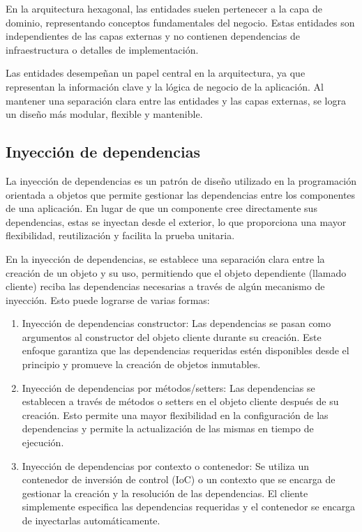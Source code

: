 \documentclass[executivepaper]{article}
\begin{document}
En la arquitectura hexagonal, las entidades suelen pertenecer a la capa de dominio, representando conceptos fundamentales del negocio. Estas entidades son independientes de las capas externas y no contienen dependencias de infraestructura o detalles de implementación.

Las entidades desempeñan un papel central en la arquitectura, ya que representan la información clave y la lógica de negocio de la aplicación. Al mantener una separación clara entre las entidades y las capas externas, se logra un diseño más modular, flexible y mantenible.

\subsection{Inyección de dependencias}

La inyección de dependencias es un patrón de diseño utilizado en la programación orientada a objetos que permite gestionar las dependencias entre los componentes de una aplicación. En lugar de que un componente cree directamente sus dependencias, estas se inyectan desde el exterior, lo que proporciona una mayor flexibilidad, reutilización y facilita la prueba unitaria.

En la inyección de dependencias, se establece una separación clara entre la creación de un objeto y su uso, permitiendo que el objeto dependiente (llamado cliente) reciba las dependencias necesarias a través de algún mecanismo de inyección. Esto puede lograrse de varias formas:

\begin{enumerate}
    \item Inyección de dependencias constructor: Las dependencias se pasan como argumentos al constructor del objeto cliente durante su creación. Este enfoque garantiza que las dependencias requeridas estén disponibles desde el principio y promueve la creación de objetos inmutables.
    \item Inyección de dependencias por métodos/setters: Las dependencias se establecen a través de métodos o setters en el objeto cliente después de su creación. Esto permite una mayor flexibilidad en la configuración de las dependencias y permite la actualización de las mismas en tiempo de ejecución.
    \item Inyección de dependencias por contexto o contenedor: Se utiliza un contenedor de inversión de control (IoC) o un contexto que se encarga de gestionar la creación y la resolución de las dependencias. El cliente simplemente especifica las dependencias requeridas y el contenedor se encarga de inyectarlas automáticamente.
\end{enumerate}
\end{document}

